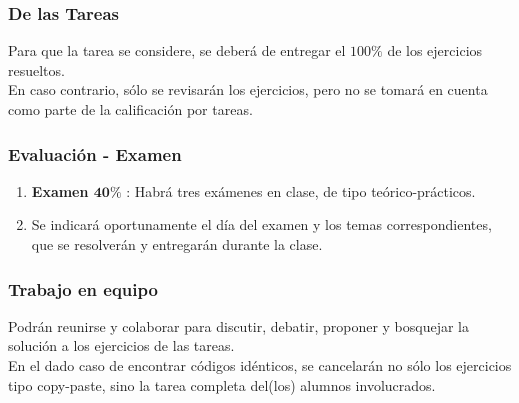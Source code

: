 \documentclass[12pt]{beamer}
\begin{document}
\begin{frame}
\frametitle{De las Tareas}
Para que la tarea se considere, se deberá de entregar el $100\%$ de los ejercicios resueltos.
\\
\bigskip
\pause
En caso contrario, sólo se revisarán los ejercicios, pero no se tomará en cuenta como parte de la calificación por tareas.
\end{frame}
\begin{frame}
\frametitle{Evaluación - Examen}
\begin{enumerate}[<+->]    
\conti
\item \textbf{Examen $\mathbf{40\%}$} : Habrá tres exámenes en clase, de tipo teórico-prácticos. 
\item Se indicará oportunamente el día del examen y los temas correspondientes, que se resolverán y entregarán durante la clase.
\end{enumerate}
\end{frame}

\begin{frame}
\frametitle{Trabajo en equipo}
Podrán reunirse y colaborar para discutir, debatir, proponer y bosquejar la solución a los ejercicios de las tareas.
\\
\bigskip
En el dado caso de encontrar códigos idénticos, se cancelarán no sólo los ejercicios tipo copy-paste, sino la tarea completa del(los) alumnos involucrados.
\end{frame}
\end{document}
